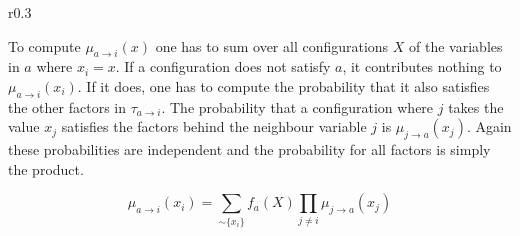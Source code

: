 \begin{wrapfigure}{r}{0.3\textwidth}

\end{wrapfigure}

To compute $\mu_{a \rightarrow i}(x)$ one has to sum over all configurations $X$ of the variables in $a$ where $x_i = x$. If a configuration does not satisfy $a$, it contributes nothing to $\mu_{a \rightarrow i}(x_i)$. If it does, one has to compute the probability that it also satisfies the other factors in $\tau_{a \rightarrow i}$. The probability that a configuration where $j$ takes the value $x_j$ satisfies the factors behind the neighbour variable $j$ is $\mu_{j \rightarrow a}(x_j)$. Again these probabilities are independent and the probability for all factors is simply the product.

$$\mu_{a \rightarrow i}(x_i) = \sum_{ \sim \{x_i\}} f_a(X) \prod_{j \neq i} \mu_{j \rightarrow a}(x_j)$$



